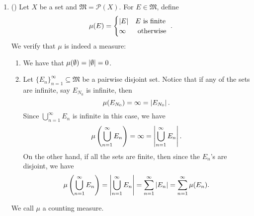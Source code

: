 \documentclass[notoc,notitlepage]{tufte-book}
\begin{document}
\begin{eg}\label{eg:examples_of_measures}
  \begin{enumerate}
    \item ()
      Let $X$ be a set and $\mathfrak{M} = \mathcal{P}(X)$.
      For $E \in \mathfrak{M}$, define
      \begin{equation*}
        \mu(E) = \begin{cases}
          \left|E\right| & E \text{ is finite } \\
          \infty  & \text{ otherwise }
        \end{cases}.
      \end{equation*}
      We verify that $\mu$ is indeed a measure:
      \begin{enumerate}
        \item We have that $\mu(\emptyset) = \left|\emptyset\right| = 0$.
        \item Let $\{ E_n \}_{n=1}^{\infty} \subseteq \mathfrak{M}$
          be a pairwise disjoint set.
          Notice that if any of the sets are infinite,
          say $E_{N_0}$ is infinite, then
          \begin{equation*}
            \mu(E_{N_0}) = \infty = \left| E_{N_0} \right|.
          \end{equation*}
          Since $\bigcup_{n=1}^{\infty} E_n$ is infinite in this case,
          we have
          \begin{equation*}
            \mu \left( \bigcup_{n=1}^{\infty} E_n \right) = \infty
            = \left| \bigcup_{n=1}^{\infty} E_n \right|.
          \end{equation*}
          On the other hand, if all the sets are finite,
          then since the $E_n$'s are disjoint, we have
          \begin{equation*}
            \mu \left( \bigcup_{n=1}^{\infty} E_n \right)
            = \left|\bigcup_{n=1}^{\infty} E_n\right|
            = \sum_{n=1}^{\infty} \left|E_n\right|
            = \sum_{n=1}^{\infty} \mu(E_n).
          \end{equation*}
      \end{enumerate}
      We call $\mu$ a counting measure.


\end{enumerate}
\end{eg}
\end{document}
